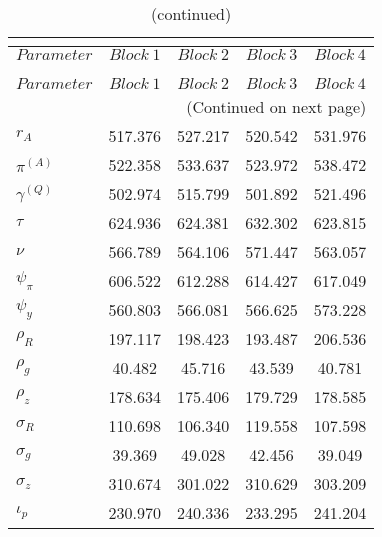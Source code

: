  
\begin{center}
\begin{longtable}{lcccc} 
\caption{MCMC Inefficiency factors per block}\\
 \label{Table:MCMC_inefficiency_factors}\\
\toprule 
$Parameter         $	 & 	 $     Block~1$	 & 	 $     Block~2$	 & 	 $     Block~3$	 & 	 $     Block~4$\\
\midrule \endfirsthead 
\caption{(continued)}\\
 \toprule \\ 
$Parameter         $	 & 	 $     Block~1$	 & 	 $     Block~2$	 & 	 $     Block~3$	 & 	 $     Block~4$\\
\midrule \endhead 
\midrule \multicolumn{5}{r}{(Continued on next page)} \\ \bottomrule \endfoot 
\bottomrule \endlastfoot 
$ {r_{A}}          $	 & 	     517.376	 & 	     527.217	 & 	     520.542	 & 	     531.976 \\ 
$ {\pi^{(A)}}      $	 & 	     522.358	 & 	     533.637	 & 	     523.972	 & 	     538.472 \\ 
$ {\gamma^{(Q)}}   $	 & 	     502.974	 & 	     515.799	 & 	     501.892	 & 	     521.496 \\ 
$ {\tau}           $	 & 	     624.936	 & 	     624.381	 & 	     632.302	 & 	     623.815 \\ 
$ {\nu}            $	 & 	     566.789	 & 	     564.106	 & 	     571.447	 & 	     563.057 \\ 
$ {\psi_\pi}       $	 & 	     606.522	 & 	     612.288	 & 	     614.427	 & 	     617.049 \\ 
$ {\psi_y}         $	 & 	     560.803	 & 	     566.081	 & 	     566.625	 & 	     573.228 \\ 
$ {\rho_R}         $	 & 	     197.117	 & 	     198.423	 & 	     193.487	 & 	     206.536 \\ 
$ {\rho_{g}}       $	 & 	      40.482	 & 	      45.716	 & 	      43.539	 & 	      40.781 \\ 
$ {\rho_z}         $	 & 	     178.634	 & 	     175.406	 & 	     179.729	 & 	     178.585 \\ 
$ {\sigma_R}       $	 & 	     110.698	 & 	     106.340	 & 	     119.558	 & 	     107.598 \\ 
$ {\sigma_{g}}     $	 & 	      39.369	 & 	      49.028	 & 	      42.456	 & 	      39.049 \\ 
$ {\sigma_z}       $	 & 	     310.674	 & 	     301.022	 & 	     310.629	 & 	     303.209 \\ 
$ {\iota_p}        $	 & 	     230.970	 & 	     240.336	 & 	     233.295	 & 	     241.204 \\ 
\end{longtable}
 \end{center}
